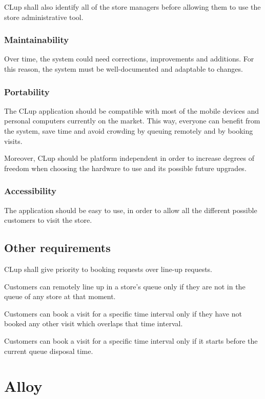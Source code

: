 \documentclass[a4paper,oneside,11pt]{book}   %
\begin{document}
    CLup shall also identify all of the store managers before allowing them to use the store administrative tool.
    
    \subsection{Maintainability}
    Over time, the system could need corrections, improvements and additions. For this reason, the system must be well-documented and adaptable to changes.
    
    \subsection{Portability}
    The CLup application should be compatible with most of the mobile devices and personal computers currently on the market. This way, everyone can benefit from the system, save time and avoid crowding by queuing remotely and by booking visits. \par
    Moreover, CLup should be platform independent in order to increase degrees of freedom when choosing the hardware to use and its possible future upgrades.
    
    \subsection{Accessibility}
    The application should be easy to use, in order to allow all the different possible customers to visit the store.
    
    \section{Other requirements}
    CLup shall give priority to booking requests over line-up requests. \par
    Customers can remotely line up in a store’s queue only if they are not in the queue of any store at that moment. \par
    Customers can book a visit for a specific time interval only if they have not booked any other visit which overlaps that time interval. \par
    Customers can book a visit for a specific time interval only if it starts before the current queue disposal time. 

\chapter{Alloy}
\end{document}
